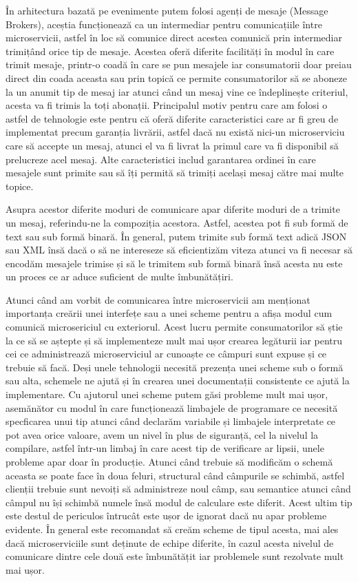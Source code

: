 În arhitectura bazată pe evenimente putem folosi agenți de mesaje (Message Brokers), 
aceștia funcționează ca un intermediar pentru comunicațiile între microservicii, astfel în loc
să comunice direct acestea comunică prin intermediar trimițând orice tip de mesaje.
Acestea oferă diferite facilități în modul în care trimit mesaje, printr-o coadă în care
se pun mesajele iar consumatorii doar preiau direct din coada aceasta sau prin topică ce permite
consumatorilor să se aboneze la un anumit tip de mesaj iar atunci când un mesaj vine ce îndeplinește
criteriul, acesta va fi trimis la toți abonații. Principalul motiv pentru care am folosi o astfel
de tehnologie este pentru că oferă diferite caracteristici care ar fi greu de implementat
precum garanția livrării, astfel dacă nu există nici-un microserviciu care să accepte un mesaj,
atunci el va fi livrat la primul care va fi disponibil să prelucreze acel mesaj. Alte caracteristici
includ garantarea ordinei în care mesajele sunt primite sau să îți permită să trimiți același 
mesaj către mai multe topice.

Asupra acestor diferite moduri de comunicare apar diferite moduri de a trimite un mesaj, 
referindu-ne la compoziția acestora. Astfel, acestea pot fi sub formă de text sau sub formă
binară. În general, putem trimite sub formă text adică JSON sau XML însă dacă o să ne intereseze
să eficientizăm viteza atunci va fi necesar să encodăm mesajele trimise și să le trimitem sub
formă binară însă acesta nu este un proces ce ar aduce suficient de multe îmbunătățiri.

Atunci când am vorbit de comunicarea între microservicii am menționat importanța creării
unei interfețe sau a unei scheme pentru a afișa modul cum comunică microsericiul cu exteriorul.
Acest lucru permite consumatorilor să știe la ce să se aștepte și să implementeze mult mai 
ușor crearea legăturii iar pentru cei ce administrează microserviciul ar cunoaște ce 
câmpuri sunt expuse și ce trebuie să facă. Deși unele tehnologii necesită prezența unei
scheme sub o formă sau alta, schemele ne ajută și în crearea unei documentații consistente
ce ajută la implementare. Cu ajutorul unei scheme putem găsi probleme mult mai ușor, asemănător
cu modul în care funcționează limbajele de programare ce necesită specficarea unui tip
atunci când declarăm variabile și limbajele interpretate ce pot avea orice valoare, 
avem un nivel în plus de siguranță, cel la nivelul la compilare, astfel într-un limbaj
în care acest tip de verificare ar lipsii, unele probleme apar doar în producție. Atunci când
trebuie să modificăm o schemă aceasta se poate face în doua feluri, structural când câmpurile se schimbă,
astfel clienții trebuie sunt nevoiți să administreze noul câmp, sau semantice atunci când câmpul
nu își schimbă numele însă modul de calculare este diferit. Acest ultim tip este destul de periculos
întrucât este ușor de ignorat dacă nu apar probleme evidente. În general este recomandat să 
creăm scheme de tipul acesta, mai ales dacă microserviciile sunt deținute de echipe diferite, 
în cazul acesta nivelul de comunicare dintre cele două este îmbunătățit iar problemele sunt
rezolvate mult mai ușor.

